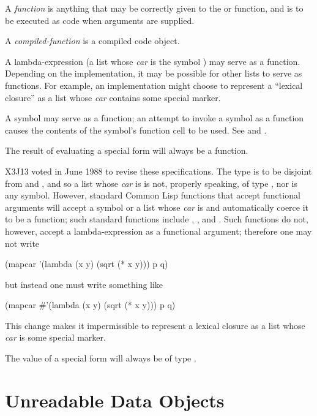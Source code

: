 \begin{obsolete}
A {\it function} is anything that may be correctly given to the 
or  function, and is
to be executed as code when arguments are supplied.

A {\it compiled-function} is a compiled code object.

A lambda-expression
(a list whose {\it car} is the symbol ) may serve as a function.
Depending on the implementation, it may be possible for other lists to
serve as functions.  For example, an implementation might choose to
represent a ``lexical closure'' as a list whose {\it car} contains some
special marker.

A symbol may serve as a function; an attempt to invoke a symbol as a function
causes the contents of the symbol's function cell to be used.
See  and .

The result of evaluating a  special form
will always be a function.
\end{obsolete}

\begin{newer}
X3J13 voted in June 1988 
to revise these specifications.  The type  is to be disjoint
from  and , and so a list whose {\it car} is 
is not, properly speaking, of type , nor is any symbol.
However,
standard Common Lisp functions that accept functional arguments
will accept a symbol or a list whose {\it car} is 
and automatically coerce it to be a function; such standard
functions include , , and .
Such functions do not, however, accept a lambda-expression as a functional
argument; therefore one may not write

\vskip 3pt
\begin{lisp}
(mapcar '(lambda (x y) (sqrt (* x y))) p q)
\end{lisp}
but instead one must write something like
\begin{lisp}
(mapcar \#'(lambda (x y) (sqrt (* x y))) p q)
\end{lisp}

This change makes it impermissible to represent a lexical closure
as a list whose {\it car} is some special marker.

The value of a  special form
will always be of type .
\end{newer}

\section{Unreadable Data Objects}

